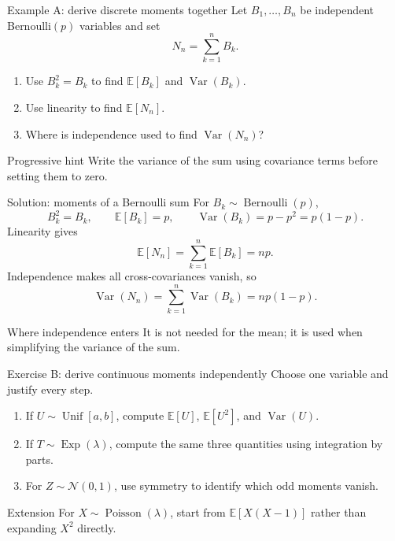 \documentclass[handout,10pt,aspectratio=169]{beamer}
\begin{document}
\begin{frame}{Example A: derive discrete moments together}
Let $B_1,\ldots,B_n$ be independent Bernoulli$(p)$ variables and set
\[
N_n=\sum_{k=1}^n B_k.
\]

\begin{enumerate}
  \item Use $B_k^2=B_k$ to find $\mathbb E[B_k]$ and $\operatorname{Var}(B_k)$.
  \item Use linearity to find $\mathbb E[N_n]$.
  \item Where is independence used to find $\operatorname{Var}(N_n)$?
\end{enumerate}

\begin{block}{Progressive hint}
Write the variance of the sum using covariance terms before setting them to zero.
\end{block}
\end{frame}

\begin{frame}{Solution: moments of a Bernoulli sum}
For $B_k\sim\operatorname{Bernoulli}(p)$,
\[
B_k^2=B_k,
\qquad
\mathbb E[B_k]=p,
\qquad
\operatorname{Var}(B_k)=p-p^2=p(1-p).
\]
Linearity gives
\[
\mathbb E[N_n]
=\sum_{k=1}^n\mathbb E[B_k]
=np.
\]
Independence makes all cross-covariances vanish, so
\[
\operatorname{Var}(N_n)
=\sum_{k=1}^n\operatorname{Var}(B_k)
=np(1-p).
\]

\begin{block}{Where independence enters}
It is not needed for the mean; it is used when simplifying the variance of the sum.
\end{block}
\end{frame}

\begin{frame}{Exercise B: derive continuous moments independently}
Choose one variable and justify every step.

\begin{enumerate}
  \item If $U\sim\operatorname{Unif}[a,b]$, compute $\mathbb E[U]$, $\mathbb E[U^2]$, and $\operatorname{Var}(U)$.
  \item If $T\sim\operatorname{Exp}(\lambda)$, compute the same three quantities using integration by parts.
  \item For $Z\sim\mathcal N(0,1)$, use symmetry to identify which odd moments vanish.
\end{enumerate}

\begin{block}{Extension}
For $X\sim\operatorname{Poisson}(\lambda)$, start from $\mathbb E[X(X-1)]$ rather than expanding $X^2$ directly.
\end{block}
\end{frame}
\end{document}
